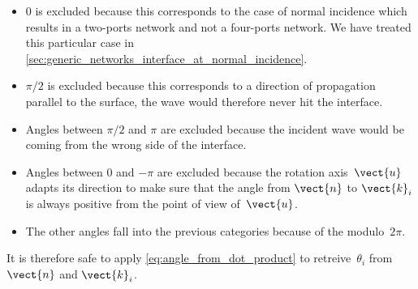 \begin{itemize}
    \item 0 is excluded because this corresponds to the case of normal incidence which results in a two-ports network and not a four-ports network.  We have treated this particular case in \vref{sec:generic_networks_interface_at_normal_incidence}.
    \item $\pi/2$ is excluded because this corresponds to a direction of propagation parallel to the surface, the wave would therefore never hit the interface.
    \item Angles between $\pi/2$ and $\pi$ are excluded because the incident wave would be coming from the wrong side of the interface.
    \item Angles between 0 and $-\pi$ are excluded because the rotation axis~$\vect{u}$ adapts its direction to make sure that the angle from $\vect{n}$ to $\vect{k}_i$ is always positive from the point of view of~$\vect{u}$.
    \item The other angles fall into the previous categories because of the modulo~$2\pi$.
\end{itemize}
It is therefore safe to apply \cref{eq:angle_from_dot_product} to retreive~$\theta_i$ from $\vect{n}$ and $\vect{k}_i$.



